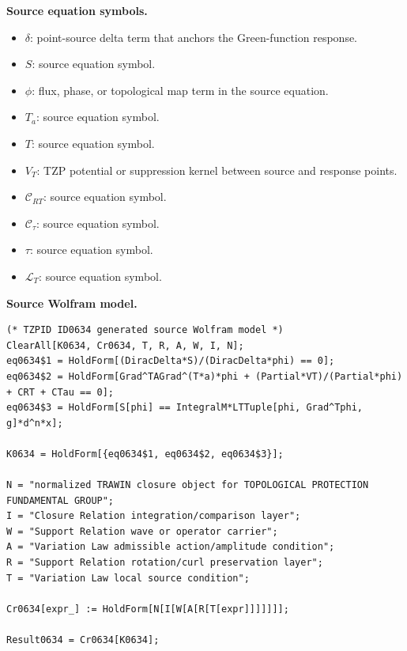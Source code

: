 \begin{minipage}[t]{0.49\linewidth}
\begingroup
\small
\raggedright
\textbf{Source equation symbols.}\par
\begin{itemize}[leftmargin=1.35em,itemsep=1pt,topsep=1pt,parsep=0pt]
    \item $\delta$: point-source delta term that anchors the Green-function response.
    \item $S$: source equation symbol.
    \item $\phi$: flux, phase, or topological map term in the source equation.
    \item $T_a$: source equation symbol.
    \item $T$: source equation symbol.
    \item $V_T$: TZP potential or suppression kernel between source and response points.
    \item $\mathcal{C}_{RT}$: source equation symbol.
    \item $\mathcal{C}_{\tau}$: source equation symbol.
    \item $\tau$: source equation symbol.
    \item $\mathcal{L}_T$: source equation symbol.
\end{itemize}
\endgroup
\end{minipage}\hfill
\begin{minipage}[t]{0.47\linewidth}
\begingroup
\scriptsize
\raggedright
\textbf{Source Wolfram model.}\par
\begin{Verbatim}[fontsize=\tiny,breaklines=true,breakanywhere=true]
(* TZPID ID0634 generated source Wolfram model *)
ClearAll[K0634, Cr0634, T, R, A, W, I, N];
eq0634$1 = HoldForm[(DiracDelta*S)/(DiracDelta*phi) == 0];
eq0634$2 = HoldForm[Grad^TAGrad^(T*a)*phi + (Partial*VT)/(Partial*phi) + CRT + CTau == 0];
eq0634$3 = HoldForm[S[phi] == IntegralM*LTTuple[phi, Grad^Tphi, g]*d^n*x];

K0634 = HoldForm[{eq0634$1, eq0634$2, eq0634$3}];

N = "normalized TRAWIN closure object for TOPOLOGICAL PROTECTION FUNDAMENTAL GROUP";
I = "Closure Relation integration/comparison layer";
W = "Support Relation wave or operator carrier";
A = "Variation Law admissible action/amplitude condition";
R = "Support Relation rotation/curl preservation layer";
T = "Variation Law local source condition";

Cr0634[expr_] := HoldForm[N[I[W[A[R[T[expr]]]]]]];

Result0634 = Cr0634[K0634];
\end{Verbatim}
\endgroup
\end{minipage}

